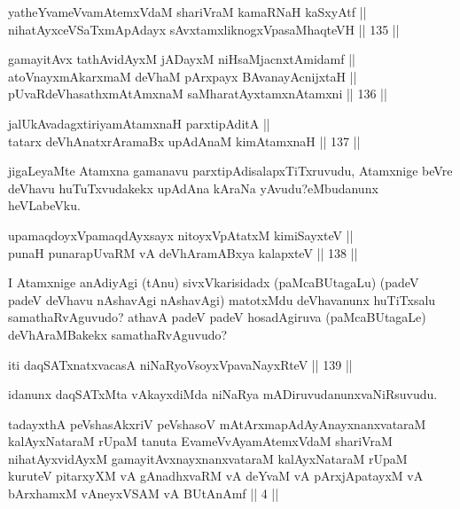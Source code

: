 \begin{shl}
yatheYvameVvamAtemxVdaM shariVraM kamaRNaH kaSxyAtf || \\
nihatAyxceVSaTxmApAdayx sAvxtamxliknogxVpasaMhaqteVH \hfill || 135 ||  
\end{shl}

\begin{shl}
gamayitAvx tathA\s vidAyxM jADayxM niHsaMjacnxtAmidamf ||  \\
atoV\s nayxmAkarxmaM deVhaM pArxpayx BAvanayA\s cnijxtaH || \\
pUvaRdeVhasathxmAtAmxnaM saMharatAyxtamxnA\s \s tamxni \hfill || 136 ||  
\end{shl}

\begin{shl}
jalUkAvadagxtiriyamAtamxnaH parxtipAditA || \\
tatarx deVhAnatxrAramaBx upAdAnaM kimAtamxnaH \hfill || 137 ||  
\end{shl}

\begin{artha}
jigaLeyaMte Atamxna gamanavu parxtipAdisalapxTiTxruvudu, Atamxnige
beVre deVhavu huTuTxvudakekx upAdAna kAraNa yAvudu?\break eMbudanunx
heVLabeVku.
\end{artha}


\begin{shl}
upamaqdoyxVpamaqdAyxsayx nitoyxVpAtatxM kimiSayxteV ||  \\
punaH punarapUvaRM vA deVhAramABxya kalapxteV \hfill || 138 ||  
\end{shl}

\begin{artha}
I Atamxnige anAdiyAgi (tAnu) sivxVkarisidadx (paMcaBUtagaLu) (padeV
padeV deVhavu nAshavAgi nAshavAgi) matotxMdu deVhavanunx huTiTxsalu
samathaRvAguvudo? athavA padeV padeV hosadAgiruva (paMcaBUtagaLe)
deVhAraMBakekx samathaRvAguvudo?
\end{artha}


\begin{shl}
iti daqSATxnatxvacasA niNaRyoV\s soyxVpavaNayxRteV \hfill || 139 ||
\end{shl}

\begin{artha}
idanunx daqSATxMta vAkayxdiMda niNaRya mADiruvudanunx\break vaNiRsuvudu.
\end{artha}

\begin{kandikeshl}
tadayxthA peVshasAkxriV peVshasoV mAtArxmapAdAyAnayxnanxvataraM kalAyxNataraM rUpaM tanuta EvameVvAyamAtemxVdaM shariVraM nihatAyxvidAyxM gamayitAvxnayxnanxvataraM kalAyxNataraM rUpaM kuruteV pitarxyXM vA gAnadhxvaRM vA deYvaM vA pArxjApatayxM vA bArxhamxM vAneyxVSAM vA BUtAnAmf || 4 ||
\end{kandikeshl}

